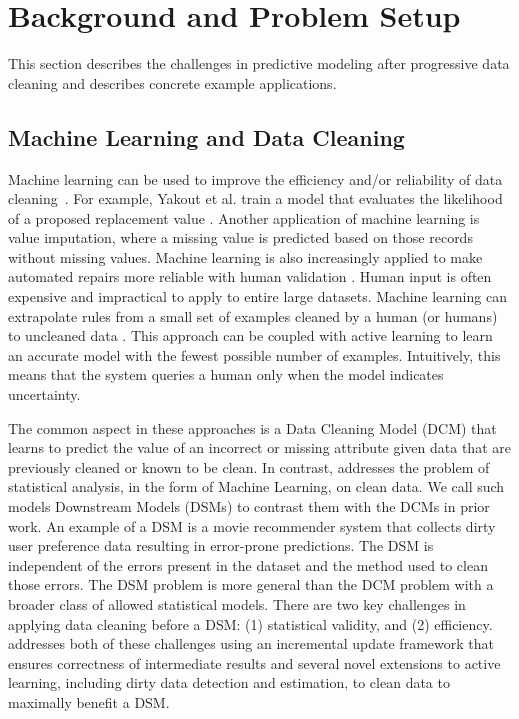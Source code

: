 \section{Background and Problem Setup}\label{background}
This section describes the challenges in predictive modeling after progressive data 
cleaning and describes concrete example applications.

\subsection{Machine Learning and Data Cleaning}\label{alrw}
Machine learning can be used to improve the efficiency and/or reliability of data cleaning~\cite{yakout2013don,gokhale2014corleone}.
For example, Yakout et al. train a model that evaluates the likelihood of a proposed replacement value \cite{yakout2013don}.
Another application of machine learning is value imputation, where a missing value is predicted based on those records without missing values.
Machine learning is also increasingly applied to make automated repairs more reliable with human validation \cite{DBLP:journals/pvldb/YakoutENOI11}.
Human input is often expensive and impractical to apply to entire large datasets.
Machine learning can extrapolate rules from a small set of examples cleaned by a human (or humans) to uncleaned data \cite{gokhale2014corleone, DBLP:journals/pvldb/YakoutENOI11}.
This approach can be coupled with active learning \cite{DBLP:journals/pvldb/MozafariSFJM14} to learn an accurate model with the fewest possible number of examples.
Intuitively, this means that the system queries a human only when the model indicates uncertainty.

The common aspect in these approaches is a Data Cleaning Model (DCM) that learns to predict the value of an incorrect or missing attribute given data that are previously cleaned or known to be clean.
In contrast, \sys addresses the problem of statistical analysis, in the form of Machine Learning, on clean data.
We call such models Downstream Models (DSMs) to contrast them with the DCMs in prior work.
An example of a DSM is a movie recommender system that collects dirty user preference data resulting in error-prone predictions.
The DSM is independent of the errors present in the dataset and the method used to clean those errors.
The DSM problem is more general than the DCM problem with a broader class of allowed statistical models.
There are two key challenges in applying data cleaning before a DSM: (1) statistical validity, and (2) efficiency. 
\sys addresses both of these challenges using an incremental update framework that ensures correctness of intermediate results and several novel extensions to active learning, including dirty data detection and estimation, to clean data to maximally benefit a DSM.

